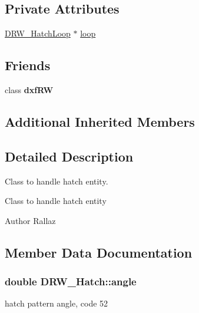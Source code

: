 \subsection*{Private Attributes}
\begin{DoxyCompactItemize}
\item 
\hyperlink{class_d_r_w___hatch_loop}{D\+R\+W\+\_\+\+Hatch\+Loop} $\ast$ \hyperlink{class_d_r_w___hatch_a2da61f1c2549cf8dacd0a0bb13366d56}{loop}
\end{DoxyCompactItemize}
\subsection*{Friends}
\begin{DoxyCompactItemize}
\item 
\hypertarget{class_d_r_w___hatch_a7f080e77e5112f8364c61b97387f8ee2}{}class {\bfseries dxf\+R\+W}\label{class_d_r_w___hatch_a7f080e77e5112f8364c61b97387f8ee2}

\end{DoxyCompactItemize}
\subsection*{Additional Inherited Members}


\subsection{Detailed Description}
Class to handle hatch entity. 

Class to handle hatch entity \begin{DoxyAuthor}{Author}
Rallaz 
\end{DoxyAuthor}


\subsection{Member Data Documentation}
\hypertarget{class_d_r_w___hatch_aee22d8d574a33e852ad82c345899b886}{}
\subsubsection[{angle}]{\setlength{\rightskip}{0pt plus 5cm}double D\+R\+W\+\_\+\+Hatch\+::angle}\label{class_d_r_w___hatch_aee22d8d574a33e852ad82c345899b886}
hatch pattern angle, code 52 \hypertarget{class_d_r_w___hatch_af152cba96e8bd0471aafd2764defe458}{}
